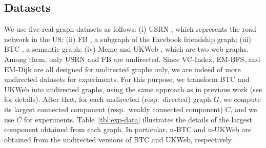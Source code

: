 \documentclass{sig-alternate}
\begin{document}
\begin{sloppy}
\subsection{Datasets} \label{sec:exp-data}

We use five real graph datasets as follows: (i) USRN \cite{USRN}, which represents the road network in the US; (ii) FB \cite{gkbm10}, a subgraph of the Facebook friendship graph; (iii) BTC \cite{BTC}, a semantic graph; (iv) Meme \cite{lbkk09} and UKWeb \cite{UKWeb}, which are two web graphs. Among them, only USRN and FB are undirected. Since VC-Index, EM-BFS, and EM-Dijk are all designed for undirected graphs only, we are indeed of more undirected datasets for experiments. For this purpose, we transform BTC and UKWeb into undirected graphs, using the same approach as in previous work (see \cite{ckcc12} for details). After that, for each undirected (resp.\ directed) graph $G$, we compute its largest connected component (resp.\ weakly connected component) $C$, and we use $C$ for experiments. Table~\ref{tbl:exp-data} illustrates the details of the largest component obtained from each graph. In particular, u-BTC and u-UKWeb are obtained from the undirected versions of BTC and UKWeb, respectively.












\end{sloppy}
\end{document}
